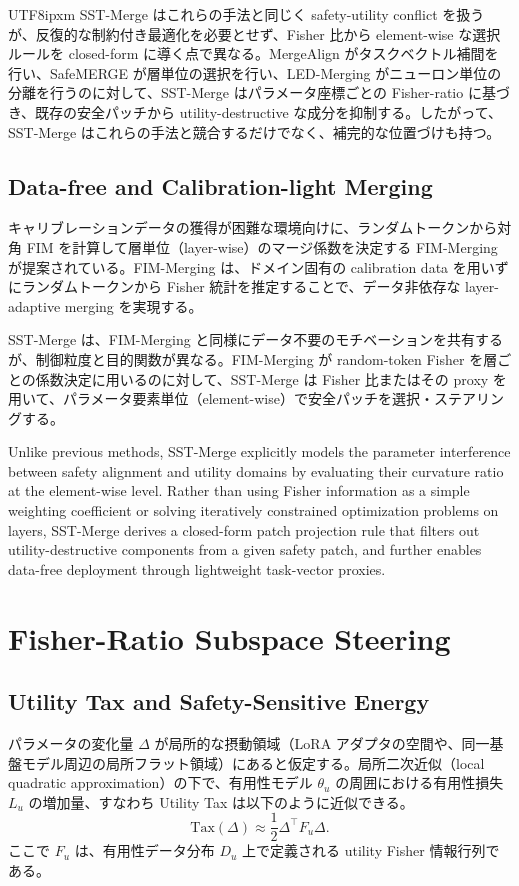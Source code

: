 \documentclass[letterpaper]{article} %
\begin{document}
\begin{CJK*}{UTF8}{ipxm}
SST-Merge はこれらの手法と同じく safety-utility conflict を扱うが、反復的な制約付き最適化を必要とせず、Fisher 比から element-wise な選択ルールを closed-form に導く点で異なる。MergeAlign がタスクベクトル補間を行い、SafeMERGE が層単位の選択を行い、LED-Merging がニューロン単位の分離を行うのに対して、SST-Merge はパラメータ座標ごとの Fisher-ratio に基づき、既存の安全パッチから utility-destructive な成分を抑制する。したがって、SST-Merge はこれらの手法と競合するだけでなく、補完的な位置づけも持つ。

\subsection{Data-free and Calibration-light Merging}
キャリブレーションデータの獲得が困難な環境向けに、ランダムトークンから対角 FIM を計算して層単位（layer-wise）のマージ係数を決定する FIM-Merging \citep{wang2026fim} が提案されている。FIM-Merging は、ドメイン固有の calibration data を用いずにランダムトークンから Fisher 統計を推定することで、データ非依存な layer-adaptive merging を実現する。

SST-Merge は、FIM-Merging と同様にデータ不要のモチベーションを共有するが、制御粒度と目的関数が異なる。FIM-Merging が random-token Fisher を層ごとの係数決定に用いるのに対して、SST-Merge は Fisher 比またはその proxy を用いて、パラメータ要素単位（element-wise）で安全パッチを選択・ステアリングする。

Unlike previous methods, SST-Merge explicitly models the parameter interference between safety alignment and utility domains by evaluating their curvature ratio at the element-wise level. Rather than using Fisher information as a simple weighting coefficient or solving iteratively constrained optimization problems on layers, SST-Merge derives a closed-form patch projection rule that filters out utility-destructive components from a given safety patch, and further enables data-free deployment through lightweight task-vector proxies.

\section{Fisher-Ratio Subspace Steering}

\subsection{Utility Tax and Safety-Sensitive Energy}
パラメータの変化量 $\Delta$ が局所的な摂動領域（LoRA アダプタの空間や、同一基盤モデル周辺の局所フラット領域）にあると仮定する。局所二次近似（local quadratic approximation）の下で、有用性モデル $\theta_u$ の周囲における有用性損失 $L_u$ の増加量、すなわち Utility Tax は以下のように近似できる。
\begin{equation}
\mathrm{Tax}(\Delta) \approx \frac{1}{2}\Delta^\top F_u \Delta.
\end{equation}
ここで $F_u$ は、有用性データ分布 $D_u$ 上で定義される utility Fisher 情報行列である。


\end{CJK*}
\end{document}
